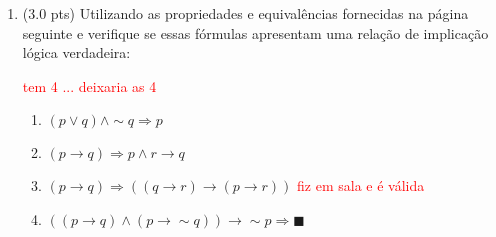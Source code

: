 \documentclass[12pt]{article}
\begin{document}
\begin{enumerate}
\item (3.0 pts) Utilizando as propriedades e equivalências
fornecidas na página seguinte
e verifique  se essas fórmulas apresentam uma relaç\~ao de implicaç\~ao lógica  verdadeira:

\textcolor{red}{tem 4 ... deixaria as 4}

\begin{enumerate}
\setlength{\itemsep}{-2pt}






\item $(p \vee q) \wedge \sim q \Rightarrow p$

\item $(p \rightarrow q) \Rightarrow p \wedge r \rightarrow q $

\item $(p \rightarrow q)  \Rightarrow ((q \rightarrow r) \rightarrow (p \rightarrow r)) $
\textcolor{red}{ fiz em sala e é válida  }




\item $((p \rightarrow q) \wedge (p \rightarrow \sim q)) \rightarrow \sim p \Rightarrow  \blacksquare$


\end{enumerate}
\end{enumerate}
\end{document}

